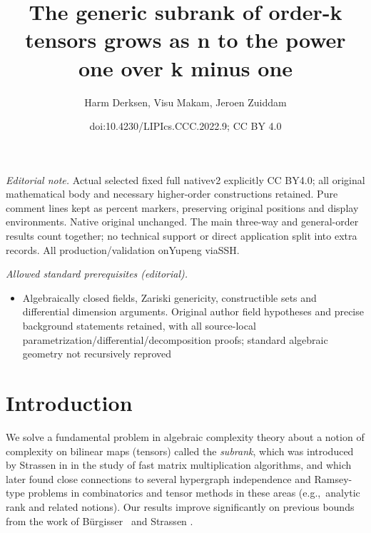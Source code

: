 \documentclass[10pt,a4paper]{article}
\title{The generic subrank of order-k tensors grows as n to the power one over k minus one}
\author{Harm Derksen, Visu Makam, Jeroen Zuiddam}
\date{doi:10.4230/LIPIcs.CCC.2022.9; CC BY 4.0}
\theoremstyle{definition}
\theoremstyle{remark}
\begin{document}
\maketitle
\noindent\textit{Editorial note.} Actual selected fixed full nativev2 explicitly CC BY4.0; all original mathematical body and necessary higher-order constructions retained. Pure comment lines kept as percent markers, preserving original positions and display environments. Native original unchanged. The main three-way and general-order results count together; no technical support or direct application split into extra records. All production/validation onYupeng viaSSH.\par\medskip
\noindent\textit{Allowed standard prerequisites (editorial).}\begin{itemize}
\item Algebraically closed fields, Zariski genericity, constructible sets and differential dimension arguments. Original author field hypotheses and precise background statements retained, with all source-local parametrization/differential/decomposition proofs; standard algebraic geometry not recursively reproved
\end{itemize}\medskip
\section{Introduction}

We solve a fundamental problem in algebraic complexity theory about a notion of complexity on bilinear maps (tensors) called the \emph{subrank}, which was introduced by Strassen in \cite{strassen1987relative} in the study of fast matrix multiplication algorithms, and which later found close connections to several hypergraph independence and Ramsey-type problems in combinatorics and tensor methods in these areas (e.g.,~analytic rank \cite{lovett2019analytic,bhrushundi2018multilinear} and related notions). 
Our results improve significantly on previous bounds from the work of 
Bürgisser~\cite{burg} and Strassen \cite{strassen1991degeneration}.
\end{document}
